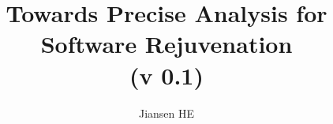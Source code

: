 \documentclass[10pt, journal, compsoc, authoryear]{article}
\numberwithin{equation}{subsection}
\theoremstyle{definition}
\begin{document}
\title{Towards Precise Analysis for Software Rejuvenation \\ (v 0.1) } %

\author{Jiansen HE}





\maketitle


\begin{comment} 
\begin{abstract} 

Software rejuvenation refers to a preventive failure recovery technique, which 
restarts a software regularly to reduce the cost of software ageing.  It has been  
actively studied in the literature and applied in enterprise level applications. 
Traditionally, a software system is modelled as a Semi-Markov process, from 
which a rejuvenation schedule is deducted to optimise the objective function 
(e.g. highest availability, lowest cost) after the system reaches its steady-state.
Unfortunately, it can takes a long time for a system to reach its steady-state.  
We propose a approximate simulation method to study XXX



\end{comment}
\end{document}
